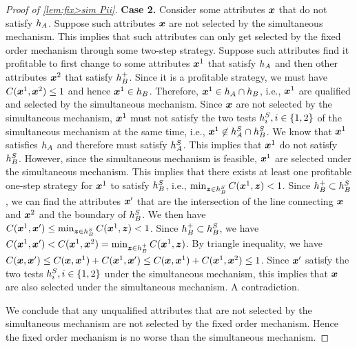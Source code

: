 \begin{proof}[Proof of \cref{lem:fix>sim Pii}]
\textbf{Case 2.} Consider some  attributes $\boldsymbol{x}$  that do not satisfy $h_A$. Suppose such  attributes $\boldsymbol{x}$  are not selected by the simultaneous mechanism. This implies that such attributes can only get selected by the fixed order mechanism through some two-step strategy. Suppose such attributes find it profitable to first change to some attributes $\boldsymbol{x}^1$ that satisfy $h_A$ and then other attributes $\boldsymbol{x}^2$ that satisfy $h_B^+$. Since it is a profitable strategy, we must have $C(\boldsymbol{x}^1,\boldsymbol{x}^2)\leq1$ and hence $\boldsymbol{x}^1\in h_B$.
Therefore, $\boldsymbol{x}^1\in h_A\cap h_B$, i.e., $\boldsymbol{x}^1$ are qualified and selected by the simultaneous mechanism.
Since $\boldsymbol{x}$  are not selected by the simultaneous mechanism, $\boldsymbol{x}^1$ must not satisfy the two tests $h_i^S,i\in \{1,2\}$ of the simultaneous mechanism at the same time, i.e., $\boldsymbol{x}^1\not\in h_A^S\cap h_B^S$. We know that $\boldsymbol{x}^1$ satisfies $h_A$ and therefore must satisfy $h_A^S$. This implies that $\boldsymbol{x}^1$ do not satisfy $h_B^S$.
However, since the simultaneous mechanism is feasible, $\boldsymbol{x}^1$ are selected under the simultaneous mechanism.
This implies that there exists at least one profitable one-step strategy for $\boldsymbol{x}^1$ to satisfy $h_B^S$, i.e., $\min_{\boldsymbol{z}\in h_B^S}C(\boldsymbol{x}^1,\boldsymbol{z})<1$.
Since $h_B^+\subset h_B^S$, we can find the attributes $\boldsymbol{x}'$ that are the intersection of the line connecting $\boldsymbol{x}$ and $\boldsymbol{x}^2$ and the boundary of $h_B^S$.
We then have  $C(\boldsymbol{x}^1,\boldsymbol{x}')\leq \min_{\boldsymbol{z}\in h_B^S}C(\boldsymbol{x}^1,\boldsymbol{z})<1$.
Since $h_B^+\subset h_B^S$, we have $C(\boldsymbol{x}^1,\boldsymbol{x}')< C(\boldsymbol{x}^1,\boldsymbol{x}^2)=\min_{\boldsymbol{z}\in h_B^+}C(\boldsymbol{x}^1,\boldsymbol{z})$.
By triangle inequality, we have $C(\boldsymbol{x},\boldsymbol{x}')\leq C(\boldsymbol{x},\boldsymbol{x}^1)+C(\boldsymbol{x}^1,\boldsymbol{x}')\leq C(\boldsymbol{x},\boldsymbol{x}^1)+C(\boldsymbol{x}^1,\boldsymbol{x}^2)\leq1$.
Since $\boldsymbol{x}'$ satisfy the two tests $h_i^S,i\in\{1,2\}$ under the simultaneous mechanism, this implies that $\boldsymbol{x}$ are also selected under the simultaneous mechanism. A contradiction.

We conclude that any unqualified attributes that are not selected by the simultaneous mechanism are not selected by the fixed order mechanism. Hence the fixed order mechanism is no worse than the simultaneous mechanism. 



\end{proof}


